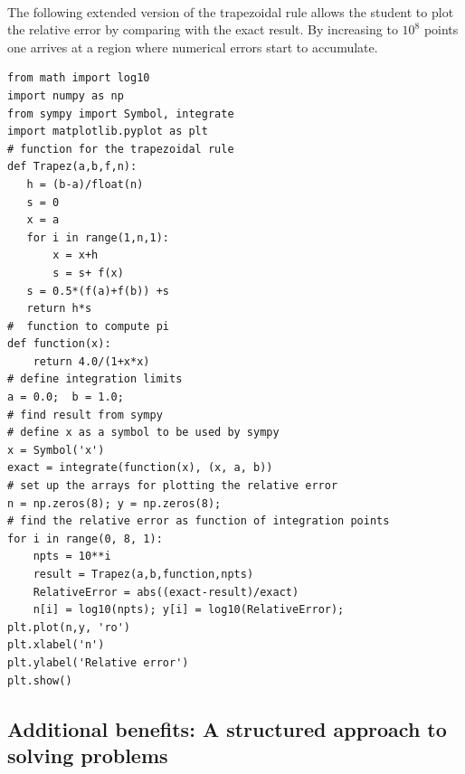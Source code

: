 \documentclass[%
twoside,                 %
final,                   %
10pt]{article}
\begin{document}
\paragraph{}
The following extended version of the trapezoidal rule allows the student to plot the relative error by comparing with the exact result. By increasing to $10^8$ points one arrives at a region where numerical errors start to accumulate.
\begin{verbatim}
from math import log10
import numpy as np
from sympy import Symbol, integrate
import matplotlib.pyplot as plt
# function for the trapezoidal rule
def Trapez(a,b,f,n):
   h = (b-a)/float(n)
   s = 0
   x = a
   for i in range(1,n,1):
       x = x+h
       s = s+ f(x)
   s = 0.5*(f(a)+f(b)) +s
   return h*s
#  function to compute pi
def function(x):
    return 4.0/(1+x*x)
# define integration limits
a = 0.0;  b = 1.0;
# find result from sympy
# define x as a symbol to be used by sympy
x = Symbol('x')
exact = integrate(function(x), (x, a, b))
# set up the arrays for plotting the relative error
n = np.zeros(8); y = np.zeros(8);
# find the relative error as function of integration points
for i in range(0, 8, 1):
    npts = 10**i
    result = Trapez(a,b,function,npts)
    RelativeError = abs((exact-result)/exact)
    n[i] = log10(npts); y[i] = log10(RelativeError);   
plt.plot(n,y, 'ro')
plt.xlabel('n')
plt.ylabel('Relative error')
plt.show()
\end{verbatim}





\subsection*{Additional benefits: A structured approach to solving problems}

\end{document}
